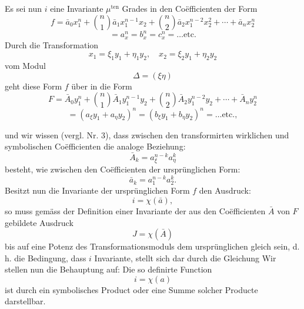 Es sei nun $i$ eine Invariante $\mu^{\text{ten}}$ Grades in den Co\"efficienten der
Form
\[
f = \bar{a}_0x_1^n + \binom{n}{1}\bar{a}_1x_1^{n-1}x_2 + \binom{n}{2}\bar{a}_2x_1^{n-2}x_2^2 + \cdots + \bar{a}_nx_2^n
\]
\[
= a_x^n = b_x^n = c_x^n = \ldots \text{etc.}
\]
Durch die Transformation
\[
x_1 = \xi_1y_1 + \eta_1y_2, \quad x_2 = \xi_2y_1 + \eta_2y_2
\]
vom Modul
\[
\Delta = (\xi\eta)
\]
geht diese Form $f$ über in die Form
\[
F = \bar{A}_0y_1^n + \binom{n}{1}\bar{A}_1y_1^{n-1}y_2 + \binom{n}{2}\bar{A}_2y_1^{n-2}y_2 + \cdots + \bar{A}_ny_2^n
\]
\[
= (a_\xi y_1 + a_\eta y_2)^n = (b_\xi y_1 + b_\eta y_2)^n = \ldots \text{etc.},
\]


und wir wissen (vergl. Nr. 3), dass zwischen den transformirten wirklichen
 und symbolischen Co\"efficienten die analoge Beziehung:
\[
\bar{A}_k = a_\xi^{n-k}a_\eta^k
\]
besteht, wie zwischen den Co\"efficienten der ursprünglichen Form:
\[
\bar{a}_k = a_1^{n-k}a_2^k.
\]
Besitzt nun die Invariante der ursprünglichen Form $f$ den Ausdruck:
\[
i = \chi(\bar{a}),
\]
so muss gemäss der Definition einer Invariante der aus den Co\"efficienten
 $\bar{A}$ von $F$ gebildete Ausdruck
\[
J = \chi(\bar{A})
\]
bis auf eine Potenz des Transformationsmoduls dem ursprünglichen
gleich sein, d. h. die Bedingung, dass $i$ Invariante, stellt sich dar
durch die Gleichung
Wir stellen nun die Behauptung auf: \glqq Die so definirte Function
\[
i = \chi(a)
\]
ist durch ein symbolisches Product oder eine Summe solcher Producte
darstellbar.\grqq{}


